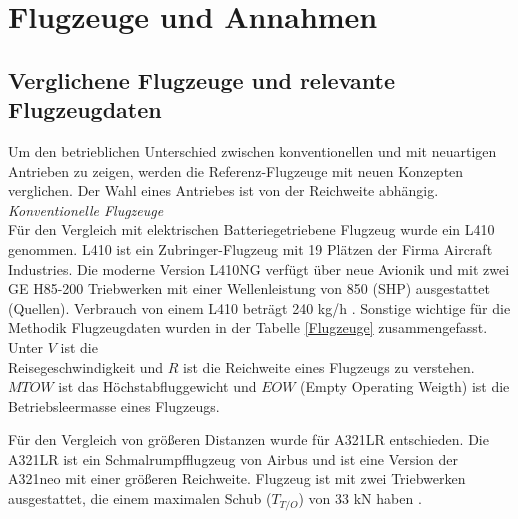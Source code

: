 \section{Flugzeuge und Annahmen}
\subsection{Verglichene Flugzeuge und relevante Flugzeugdaten}
\label{ss:Relevante Flugzeugdaten}
%
Um den betrieblichen Unterschied zwischen konventionellen und mit neuartigen Antrieben zu zeigen, werden die Referenz-Flugzeuge mit neuen 
Konzepten verglichen. 
Der Wahl eines Antriebes ist von der Reichweite abhängig.\\
%
\textit{Konventionelle Flugzeuge}\\
%
Für den Vergleich mit elektrischen Batteriegetriebene Flugzeug wurde ein L410 genommen. 
L410 ist ein Zubringer-Flugzeug mit 19 Plätzen der Firma Aircraft Industries. 
Die moderne Version L410NG verfügt über neue Avionik und mit zwei GE H85-200 Triebwerken mit einer Wellenleistung von 850 (SHP) ausgestattet (Quellen).
Verbrauch von einem L410 beträgt 240 kg/h \cite{let2016l410}. Sonstige wichtige für die Methodik Flugzeugdaten wurden in der Tabelle \ref{Flugzeuge} zusammengefasst.
Unter $V$ ist die \\ Reisegeschwindigkeit und $R$ ist die Reichweite eines Flugzeugs zu verstehen. $MTOW$ ist das Höchstabfluggewicht 
und $EOW$ (Empty Operating Weigth) ist die Betriebsleermasse eines Flugzeugs.

Für den Vergleich von größeren Distanzen wurde für A321LR entschieden. 
Die A321LR ist ein Schmalrumpfflugzeug von Airbus und ist eine Version der A321neo mit einer größeren Reichweite.
Flugzeug ist mit zwei Triebwerken ausgestattet, die einem maximalen Schub ($T_{T/O}$) von 33 kN haben \cite{eurocontrol_a321}.

